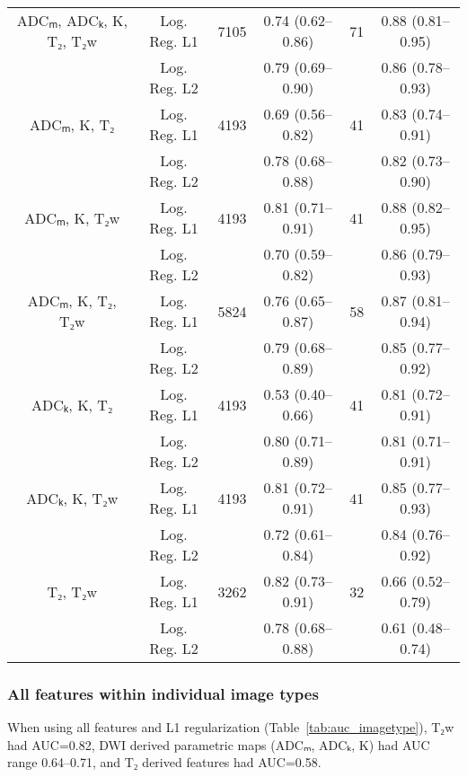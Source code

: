\documentclass[10pt,letterpaper]{article}
\newcommand{\ci}[1]{{\small (#1)}}  %
\begin{document}
\begin{table}[!h]
\begin{adjustwidth}{-2.25in}{0in}
\begin{tabular}{c c  c c  c c}
ADCₘ, ADCₖ, K, T₂, T₂w & Log. Reg. L1 & 7105 & 0.74 \ci{0.62--0.86} & 71 & 0.88 \ci{0.81--0.95} \\
                       & Log. Reg. L2 &      & 0.79 \ci{0.69--0.90} &    & 0.86 \ci{0.78--0.93} \\
ADCₘ, K, T₂            & Log. Reg. L1 & 4193 & 0.69 \ci{0.56--0.82} & 41 & 0.83 \ci{0.74--0.91} \\
                       & Log. Reg. L2 &      & 0.78 \ci{0.68--0.88} &    & 0.82 \ci{0.73--0.90} \\
ADCₘ, K, T₂w           & Log. Reg. L1 & 4193 & 0.81 \ci{0.71--0.91} & 41 & 0.88 \ci{0.82--0.95} \\
                       & Log. Reg. L2 &      & 0.70 \ci{0.59--0.82} &    & 0.86 \ci{0.79--0.93} \\
ADCₘ, K, T₂, T₂w       & Log. Reg. L1 & 5824 & 0.76 \ci{0.65--0.87} & 58 & 0.87 \ci{0.81--0.94} \\
                       & Log. Reg. L2 &      & 0.79 \ci{0.68--0.89} &    & 0.85 \ci{0.77--0.92} \\
ADCₖ, K, T₂            & Log. Reg. L1 & 4193 & 0.53 \ci{0.40--0.66} & 41 & 0.81 \ci{0.72--0.91} \\
                       & Log. Reg. L2 &      & 0.80 \ci{0.71--0.89} &    & 0.81 \ci{0.71--0.91} \\
ADCₖ, K, T₂w           & Log. Reg. L1 & 4193 & 0.81 \ci{0.72--0.91} & 41 & 0.85 \ci{0.77--0.93} \\
                       & Log. Reg. L2 &      & 0.72 \ci{0.61--0.84} &    & 0.84 \ci{0.76--0.92} \\
T₂, T₂w                & Log. Reg. L1 & 3262 & 0.82 \ci{0.73--0.91} & 32 & 0.66 \ci{0.52--0.79} \\
                       & Log. Reg. L2 &      & 0.78 \ci{0.68--0.88} &    & 0.61 \ci{0.48--0.74} \\
\hline
\end{tabular}
\end{adjustwidth}
\end{table}


\subsubsection{All features within individual image types}

When using all features and L1 regularization (Table~\ref{tab:auc_imagetype}),
T₂w had AUC=0.82, DWI derived parametric maps (ADCₘ, ADCₖ, K) had AUC range
0.64--0.71, and T₂ derived features had AUC=0.58.
\end{document}
